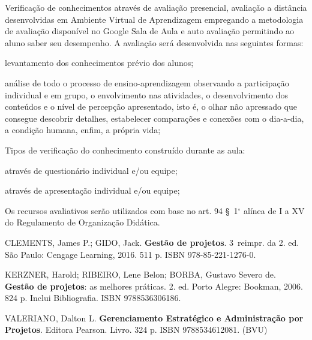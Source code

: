 \begin{pud}
	
	\avaliacao
	Verificação de conhecimentos através de avaliação presencial, avaliação a distância desenvolvidas em Ambiente Virtual de Aprendizagem empregando a metodologia de avaliação disponível no Google Sala de Aula e auto avaliação permitindo ao aluno saber seu desempenho. A avaliação será desenvolvida nas seguintes formas:
	\begin{description}[itemsep=0em, ]
		\item[$\bullet$ Diagnóstica --] levantamento dos conhecimentos prévio dos alunos;
        \item[$\bullet$ Continuada --] análise de todo o processo de ensino-aprendizagem observando a participação individual e em grupo, o envolvimento nas atividades, o desenvolvimento dos conteúdos e o nível de percepção apresentado, isto é, o olhar não apressado que consegue descobrir detalhes, estabelecer comparações e conexões com o dia-a-dia, a condição humana, enfim, a própria vida;
	\end{description}
        
    Tipos de verificação do conhecimento construído durante as aula: 
	\begin{description}[itemsep=0em, ]
		\item[$\bullet$ Escrita,] através de questionário individual e/ou equipe;
        \item[$\bullet$ Oral,] através de apresentação individual e/ou equipe;
	\end{description}
	Os recursos avaliativos serão utilizados com base  no art. 94 \S~1$^\circ$ alínea de I a XV do Regulamento de Organização Didática.


	\clearpage
	\begin{bibbasica}
		
		\item CLEMENTS, James P.; GIDO, Jack. \textbf{Gestão de projetos}. 3\textordfeminine\ reimpr. da 2. ed. São Paulo: Cengage Learning, 2016. 511 p. ISBN 978-85-221-1276-0.	
        \item KERZNER, Harold; RIBEIRO, Lene Belon; BORBA, Gustavo Severo de. \textbf{Gestão de projetos}: as melhores práticas. 2. ed. Porto Alegre: Bookman, 2006. 824 p. Inclui Bibliografia. ISBN 9788536306186.
		\item VALERIANO, Dalton L. \textbf{Gerenciamento Estratégico e Administração por Projetos}. Editora Pearson. Livro. 324 p. ISBN 9788534612081. (BVU) 	
		
	\end{bibbasica}
	

\end{pud}
